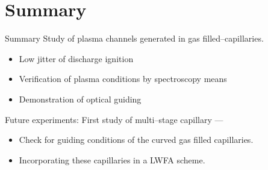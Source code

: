 \documentclass[dvipsnames]{beamer}
\begin{document}
\section{Summary}
\begin{frame}{Summary}
Study of plasma channels generated in gas filled--capillaries.

\begin{itemize}
\item Low jitter of discharge ignition
\item Verification of plasma conditions by spectroscopy means
\item Demonstration of optical guiding
\end{itemize}
Future experiments: First study of multi--stage capillary ---
\begin{itemize}
\item Check for guiding conditions of the curved gas filled capillaries.
\item Incorporating these capillaries in a LWFA scheme.
\end{itemize}

\end{frame}
%     
\end{document}

